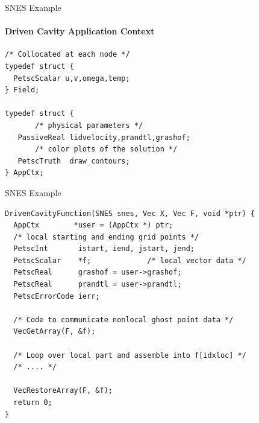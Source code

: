 
\begin{frame}[fragile]{SNES Example}
\framesubtitle{Driven Cavity Application Context}
\begin{verbatim}
/* Collocated at each node */
typedef struct {
  PetscScalar u,v,omega,temp;
} Field;

typedef struct {
       /* physical parameters */
   PassiveReal lidvelocity,prandtl,grashof;
       /* color plots of the solution */
   PetscTruth  draw_contours;
} AppCtx;
\end{verbatim}
\end{frame}

\begin{frame}[fragile]{SNES Example}
\begin{verbatim}
DrivenCavityFunction(SNES snes, Vec X, Vec F, void *ptr) {
  AppCtx        *user = (AppCtx *) ptr;
  /* local starting and ending grid points */
  PetscInt       istart, iend, jstart, jend;
  PetscScalar    *f;             /* local vector data */
  PetscReal      grashof = user->grashof;  
  PetscReal      prandtl = user->prandtl;
  PetscErrorCode ierr;

  /* Code to communicate nonlocal ghost point data */
  VecGetArray(F, &f);

  /* Loop over local part and assemble into f[idxloc] */
  /* .... */

  VecRestoreArray(F, &f);
  return 0;
}
\end{verbatim}
\end{frame}


